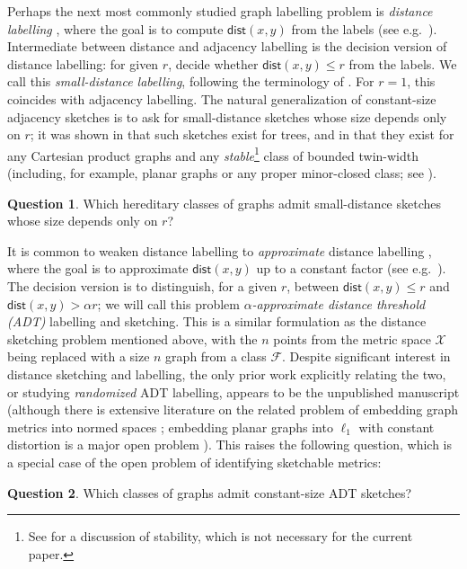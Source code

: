 \documentclass[11pt]{article}
\theoremstyle{definition}
\newtheorem{qn}{Question}
\renewcommand{\leq}{\leqslant}
\def\F {{\mathcal F}}
\def\X {{\mathcal X}}
\newcommand{\dist}{\mathsf{dist}}
\begin{document}
\noindent
Perhaps the next most commonly studied graph labelling problem is \emph{distance labelling}
\cite{GPPR04}, where the goal is to compute $\dist(x,y)$ from the labels (see
e.g.~\cite{ADKP16,AGHP16a,FGNW17,GU21}).  Intermediate between distance and adjacency labelling is
the decision version of distance labelling: for given $r$, decide whether $\dist(x,y) \leq r$ from
the labels. We call this \emph{small-distance labelling}, following the terminology of
\cite{ABR05,GL07}.  For $r=1$, this coincides with adjacency labelling. The natural generalization
of constant-size adjacency sketches is to ask for small-distance sketches whose size depends only on
$r$; it was shown in \cite{Har20} that such sketches exist for trees, and in \cite{HWZ21} that they
exist for any Cartesian product graphs and any \emph{stable}\footnote{See \cite{HWZ21} for a
discussion of stability, which is not necessary for the current paper.} class of bounded
twin-width (including, for example, planar graphs or any proper minor-closed
class; see \cite{GPT21}).

\begin{qn}
\label{question:small-distance}
Which hereditary classes of graphs admit small-distance sketches whose size depends only on $r$?
\end{qn}

\noindent
It is common to weaken distance labelling to \emph{approximate} distance labelling \cite{GKK+01},
where the goal is to approximate $\dist(x,y)$ up to a constant factor (see
e.g.~\cite{Thor04,ACG12,AGHP16b}). The decision version is to distinguish, for a
given $r$, between $\dist(x,y) \leq r$ and $\dist(x,y) > \alpha r$; we will call this problem
\emph{$\alpha$-approximate distance threshold (ADT)} labelling and sketching. This is a similar
formulation as the distance sketching problem mentioned above, with the $n$ points from the metric
space $\X$ being replaced with a size $n$ graph from a class $\F$. Despite significant interest in
distance sketching and labelling, the only prior work explicitly relating the two, or studying
\emph{randomized} ADT labelling, appears to be the unpublished manuscript \cite{AK08} (although
there is extensive literature on the related problem of embedding graph metrics into normed spaces
\cite[Chapter 15]{Mat13}; embedding planar graphs into $\ell_1$ with constant
distortion is a major open problem \cite{GNRS04}). This raises the following question, which is a
special case of the open problem of identifying sketchable metrics:

\begin{qn}
\label{question:adt}
Which classes of graphs admit constant-size ADT sketches?
\end{qn}
\end{document}
